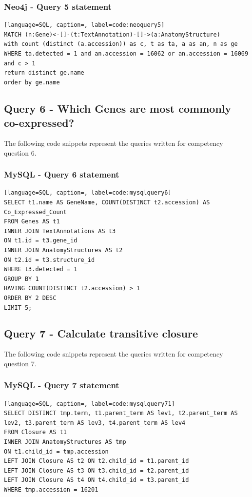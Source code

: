 \subsubsection*{Neo4j - Query 5 statement}\label{neoquery5statement}

\begin{lstlisting}[language=SQL, caption=, label=code:neoquery5]
MATCH (n:Gene)<-[]-(t:TextAnnotation)-[]->(a:AnatomyStructure)
with count (distinct (a.accession)) as c, t as ta, a as an, n as ge
WHERE ta.detected = 1 and an.accession = 16062 or an.accession = 16069 and c > 1
return distinct ge.name
order by ge.name
\end{lstlisting}

\subsection*{Query 6 - Which Genes are most commonly co-expressed?}\label{query6}
The following code snippets represent the queries written for competency question 6.

\subsubsection*{MySQL - Query 6 statement}\label{mysqlquery6statement}


\begin{lstlisting}[language=SQL, caption=, label=code:mysqlquery6]
SELECT t1.name AS GeneName, COUNT(DISTINCT t2.accession) AS Co_Expressed_Count
FROM Genes AS t1
INNER JOIN TextAnnotations AS t3
ON t1.id = t3.gene_id
INNER JOIN AnatomyStructures AS t2
ON t2.id = t3.structure_id
WHERE t3.detected = 1
GROUP BY 1
HAVING COUNT(DISTINCT t2.accession) > 1
ORDER BY 2 DESC
LIMIT 5;
\end{lstlisting}

\subsection*{Query 7 - Calculate transitive closure}\label{query7}
The following code snippets represent the queries written for competency question 7.

\subsubsection*{MySQL - Query 7 statement}\label{mysqlquery7statement}

\begin{lstlisting}[language=SQL, caption=, label=code:mysqlquery71]
SELECT DISTINCT tmp.term, t1.parent_term AS lev1, t2.parent_term AS lev2, t3.parent_term AS lev3, t4.parent_term AS lev4
FROM Closure AS t1
INNER JOIN AnatomyStructures AS tmp
ON t1.child_id = tmp.accession
LEFT JOIN Closure AS t2 ON t2.child_id = t1.parent_id
LEFT JOIN Closure AS t3 ON t3.child_id = t2.parent_id
LEFT JOIN Closure AS t4 ON t4.child_id = t3.parent_id
WHERE tmp.accession = 16201
\end{lstlisting}

